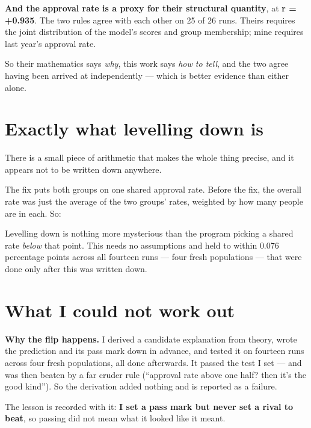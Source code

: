 \documentclass[11pt,a4paper]{article}
\begin{document}
\textbf{And the approval rate is a proxy for their structural quantity}, at
\textbf{r = +0.935}. The two rules agree with each other on 25 of 26 runs. Theirs
requires the joint distribution of the model's scores and group membership; mine requires
last year's approval rate.

So their mathematics says \emph{why}, this work says \emph{how to tell}, and the two agree
having been arrived at independently --- which is better evidence than either alone.

\section{Exactly what levelling down is}

There is a small piece of arithmetic that makes the whole thing precise, and it appears not
to be written down anywhere.

The fix puts both groups on one shared approval rate. Before the fix, the overall rate was
just the average of the two groups' rates, weighted by how many people are in each. So:

\begin{center}
\end{center}

Levelling down is nothing more mysterious than the program picking a shared rate
\emph{below} that point. This needs no assumptions and held to within $0.076$ percentage
points across all fourteen runs --- four fresh populations --- that were done only after
this was written down.

\section{What I could not work out}

\textbf{Why the flip happens.} I derived a candidate explanation from theory, wrote the
prediction and its pass mark down in advance, and tested it on fourteen runs across four
fresh populations, all done
afterwards. It passed the test I set --- and was then beaten by a far cruder rule
(``approval rate above one half? then it's the good kind''). So the derivation added nothing
and is reported as a failure.

The lesson is recorded with it: \textbf{I set a pass mark but never set a rival to beat}, so
passing did not mean what it looked like it meant.
\end{document}

